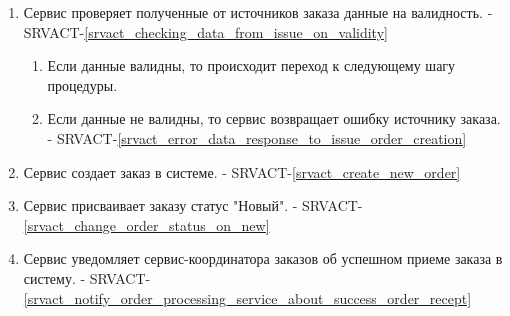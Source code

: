         \begin{alg} \label{alg_reception_order_service} \mbox{}

             \begin{enumerate}

               \item Сервис проверяет полученные от источников заказа данные на валидность. - SRVACT-\ref{srvact_checking_data_from_issue_on_validity}

                  \begin{enumerate}
               
                    \item Если данные валидны, то происходит переход к следующему шагу процедуры.
               
                    \item Если данные не валидны, то сервис возвращает ошибку источнику заказа. - SRVACT-\ref{srvact_error_data_response_to_issue_order_creation}
               
                  \end{enumerate}
               
               \item Сервис создает заказ в системе. - SRVACT-\ref{srvact_create_new_order}
              
               \item Сервис присваивает заказу статус "Новый". - SRVACT-\ref{srvact_change_order_status_on_new}

               \item Сервис уведомляет сервис-координатора заказов об успешном приеме заказа в систему. - SRVACT-\ref{srvact_notify_order_processing_service_about_success_order_recept}

             \end{enumerate}

             \end{alg}

